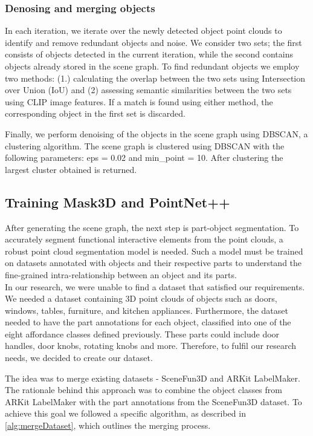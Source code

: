 \subsubsection{Denosing and merging objects}
In each iteration, we iterate over the newly detected object point clouds to identify and remove redundant objects and noise. We consider two sets;
the first consists of objects detected in the current iteration, while the second contains objects already stored in the scene graph. To find redundant objects 
we employ two methods: (1.) calculating the overlap between the two sets using Intersection over Union (IoU) and (2) assessing semantic similarities between the two sets using CLIP image 
features. If a match is found using either method, the corresponding object in the first set is discarded.

Finally, we perform denoising of the objects in the scene graph using DBSCAN, a clustering algorithm. The scene graph is clustered using DBSCAN with the following parameters:
eps = 0.02 and min\_point = 10. After clustering the largest cluster obtained is returned. 

\subsection{Training Mask3D and PointNet++}
After generating the scene graph, the next step is part-object segmentation. To accurately segment functional interactive 
elements from the point clouds, a robust point cloud segmentation model is needed. Such a model
must be trained on datasets annotated with objects and their respective parts to understand the fine-grained intra-relationship 
between an object and its parts. \\
In our research, we were unable to find a dataset that satisfied our requirements. We needed a dataset containing 3D point clouds
 of objects such as doors, windows, tables, furniture, and kitchen appliances. Furthermore, the dataset needed to have 
 the part annotations for each object, classified into one of the eight affordance classes defined previously. 
 These parts could include door handles, door knobs, rotating knobs and more.  Therefore,
to fulfil our research needs, we decided to create our dataset.

The idea was to merge existing datasets - SceneFun3D and ARKit LabelMaker. The rationale behind this approach was 
to combine the object classes from ARKit LabelMaker with the part annotations from the SceneFun3D dataset. 
To achieve this goal we followed a specific algorithm, as described in \cref{alg:mergeDataset}, which outlines the merging process.

